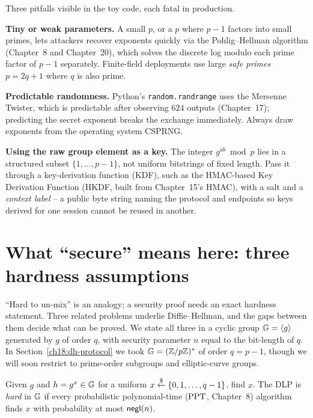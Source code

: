 \begin{trapbox}
Three pitfalls visible in the toy code, each fatal in production.

\textbf{Tiny or weak parameters.} A small $p$, or a $p$ where $p-1$ factors into small primes, lets attackers recover exponents quickly via the Pohlig--Hellman algorithm (Chapter~8 and Chapter~20), which solves the discrete log modulo each prime factor of $p-1$ separately. Finite-field deployments use large \emph{safe primes} $p = 2q+1$ where $q$ is also prime.

\textbf{Predictable randomness.} Python's \texttt{random.randrange} uses the Mersenne Twister, which is predictable after observing $624$ outputs (Chapter~17); predicting the secret exponent breaks the exchange immediately. Always draw exponents from the operating system CSPRNG.

\textbf{Using the raw group element as a key.} The integer $g^{ab} \bmod p$ lies in a structured subset $\{1, \dots, p-1\}$, not uniform bitstrings of fixed length. Pass it through a key-derivation function (KDF), such as the HMAC-based Key Derivation Function (HKDF, built from Chapter~15's HMAC), with a salt and a \emph{context label} -- a public byte string naming the protocol and endpoints so keys derived for one session cannot be reused in another.
\end{trapbox}

\section{What ``secure'' means here: three hardness assumptions}
\label{ch18:assumptions}

``Hard to un-mix'' is an analogy; a security proof needs an exact hardness statement. Three related problems underlie Diffie--Hellman, and the gaps between them decide what can be proved. We state all three in a cyclic group $\mathbb{G} = \langle g \rangle$ generated by $g$ of order $q$, with security parameter $n$ equal to the bit-length of $q$. In Section~\ref{ch18:dh-protocol} we took $\mathbb{G} = (\mathbb{Z}/p\mathbb{Z})^{*}$ of order $q = p-1$, though we will soon restrict to prime-order subgroups and elliptic-curve groups.

\begin{definition}
\label{ch18:dlp}
Given $g$ and $h = g^x \in \mathbb{G}$ for a uniform $x \stackrel{\$}{\gets} \{0, 1, \dots, q-1\}$, find $x$. The DLP is \emph{hard} in $\mathbb{G}$ if every probabilistic polynomial-time ($\mathrm{PPT}$, Chapter~8) algorithm finds $x$ with probability at most $\mathsf{negl}(n)$.
\end{definition}

